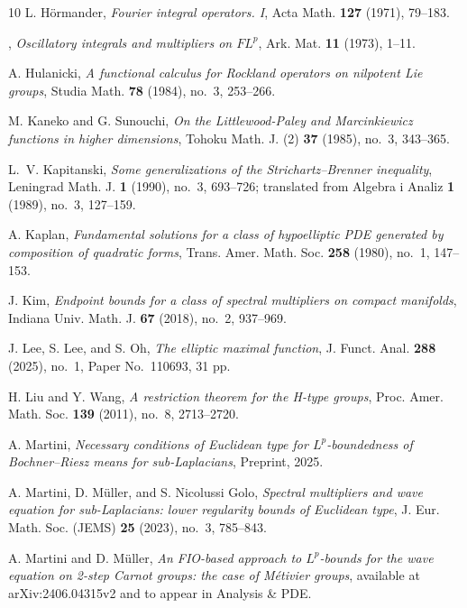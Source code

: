 \documentclass[leqno]{amsart}
\theoremstyle{definition}
\theoremstyle{remark}
\numberwithin{equation}{section}
\begin{document}
\begin{thebibliography}{10}
L. Hörmander, \emph{Fourier integral operators. {I}}, Acta Math.
  \textbf{127} (1971), 79--183. 

\bysame, \emph{Oscillatory integrals and multipliers on ${FL}^{p}$},
  Ark. Mat. \textbf{11} (1973), 1--11. 
 
A. Hulanicki, \emph{A functional calculus for {R}ockland operators on
  nilpotent {L}ie groups}, Studia Math. \textbf{78} (1984), no.~3, 253--266.

M. Kaneko and G. Sunouchi, \emph{On the {L}ittlewood-{P}aley
  and {M}arcinkiewicz functions in higher dimensions}, Tohoku Math. J. (2)
  \textbf{37} (1985), no.~3, 343--365. 

L.~V. Kapitanski, \emph{Some generalizations of the
  Strichartz--Brenner inequality}, Leningrad Math. J. \textbf{1} (1990),
  no.~3, 693--726; translated from Algebra i Analiz \textbf{1} (1989),
  no.~3, 127--159. 

A. Kaplan, \emph{Fundamental solutions for a class of hypoelliptic {PDE}
  generated by composition of quadratic forms}, Trans. Amer. Math. Soc.
  \textbf{258} (1980), no.~1, 147--153. 

J. Kim, \emph{Endpoint bounds for a class of spectral multipliers on compact
  manifolds}, Indiana Univ. Math. J. \textbf{67} (2018), no.~2, 937--969.

J. Lee, S. Lee, and S. Oh, \emph{The elliptic maximal function},
  J. Funct. Anal. \textbf{288} (2025), no.~1, Paper No.~110693, 31 pp.
  
H. Liu and Y. Wang, \emph{A restriction theorem for the {H}-type
  groups}, Proc. Amer. Math. Soc. \textbf{139} (2011), no.~8, 2713--2720.

A. Martini, \emph{Necessary conditions of {E}uclidean type for
  ${L}^p$-boundedness of {B}ochner--{R}iesz means for sub-{L}aplacians},
  Preprint, 2025.
  
A. Martini, D. Müller, and S. Nicolussi Golo, \emph{Spectral multipliers
  and wave equation for sub-Laplacians: lower regularity bounds of Euclidean
  type}, J. Eur. Math. Soc. (JEMS) \textbf{25} (2023), no.~3, 785--843.

A. Martini and D. Müller, \emph{An FIO-based approach to
  ${L}^p$-bounds for the wave equation on 2-step {C}arnot groups: the case of
  {M}étivier groups}, available at arXiv:2406.04315v2 and to appear in
  Analysis \& PDE.


\end{thebibliography}
\end{document}
